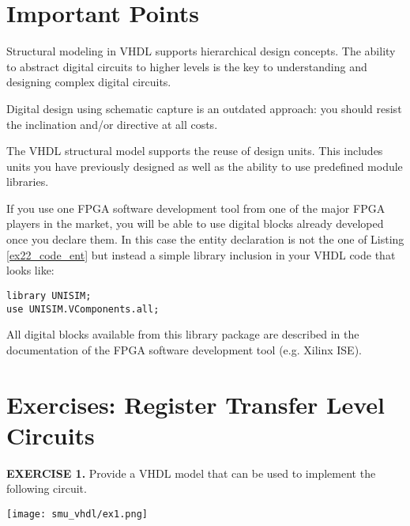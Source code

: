 \section{Important Points}
\begin{my_list}
\item Structural modeling in VHDL supports hierarchical design concepts. The ability to abstract digital circuits to higher levels is the key to understanding and designing complex digital circuits.

\item Digital design using schematic capture is an outdated approach: you should resist the inclination and/or directive at all costs.

\item The VHDL structural model supports the reuse of design units. This includes units you have previously designed as well as the ability to use predefined module libraries.

\item If you use one FPGA software development tool from one of the major FPGA players in the market, you will be able to use digital blocks already developed once you declare them. In this case the entity declaration is not the one of Listing \ref{ex22_code_ent} but instead a simple library inclusion in your VHDL code that looks like:

\vspace*{5pt}
\noindent
\begin{minipage}{0.99\textwidth}
\texttt{library UNISIM;}\\
\texttt{use UNISIM.VComponents.all;}\\
\end{minipage}
All digital blocks available from this library package are described in the documentation of the FPGA software development tool (e.g. Xilinx ISE).
\end{my_list}

\section{Exercises: Register Transfer Level Circuits}

\vspace{20pt}
\noindent
\begin{minipage}[t]{0.5\textwidth}
\textbf{EXERCISE 1.}
Provide a VHDL model that can be used to implement the following circuit.
\end{minipage}
\begin{minipage}[t]{0.47\textwidth}
\vspace{0pt}\raggedright
\centering
\texttt{[image: smu\_vhdl/ex1.png]}
\end{minipage}

